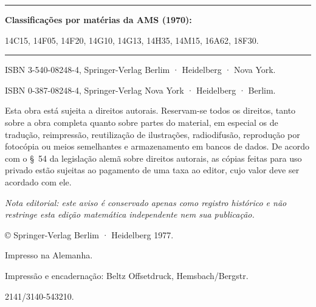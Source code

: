 \vfill

\hrule
\medskip
\textbf{Classificações por matérias da AMS (1970):}\par
14C15, 14F05, 14F20, 14G10, 14G13, 14H35, 14M15, 16A62, 18F30.
\medskip
\hrule

\medskip
ISBN 3-540-08248-4, Springer-Verlag Berlim · Heidelberg · Nova York.\par
ISBN 0-387-08248-4, Springer-Verlag Nova York · Heidelberg · Berlim.

\medskip
Esta obra está sujeita a direitos autorais. Reservam-se todos os direitos, tanto sobre a obra completa quanto sobre partes do material, em especial os de tradução, reimpressão, reutilização de ilustrações, radiodifusão, reprodução por fotocópia ou meios semelhantes e armazenamento em bancos de dados. De acordo com o §~54 da legislação alemã sobre direitos autorais, as cópias feitas para uso privado estão sujeitas ao pagamento de uma taxa ao editor, cujo valor deve ser acordado com ele.

\medskip
\emph{Nota editorial: este aviso é conservado apenas como registro histórico e não restringe esta edição matemática independente nem sua publicação.}\par

\medskip
© Springer-Verlag Berlim · Heidelberg 1977.\par
Impresso na Alemanha.\par
Impressão e encadernação: Beltz Offsetdruck, Hemsbach/Bergstr.\par
2141/3140-543210.
\clearpage
